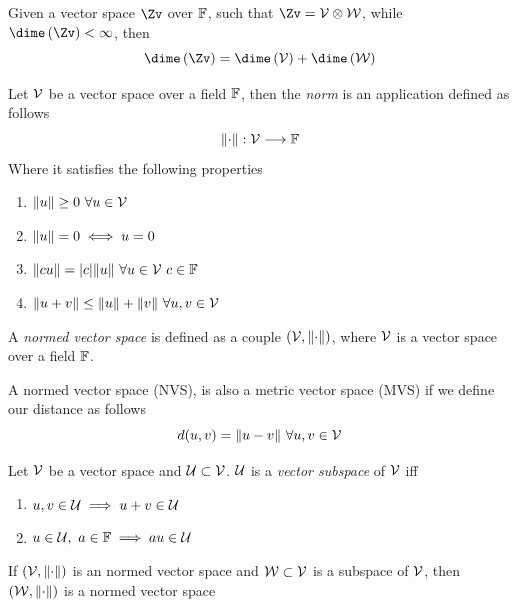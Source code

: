 \documentclass[../complete.tex]{subfiles}
\begin{document}
\begin{thm}
	Given a vector space $\Zv$ over $\mathbb{F}$, such that $\Zv=\V\otimes\W$, while $\dime\left( \Zv \right)<\infty$, then
	\begin{equation*}
		\dime\left( \Zv \right)=\dime\left( \V \right)+\dime\left( \W \right)
	\end{equation*}
\end{thm}
\begin{dfn}[Norm]
	Let $\mathcal{V}$ be a vector space over a field $\mathbb{F}$, then the \textit{norm} is an application defined as follows
	\begin{equation*}
		\norm{\cdot}:\mathcal{V}\overset{}{\longrightarrow}\mathbb{F}
	\end{equation*}
	Where it satisfies the following properties
	\begin{enumerate}
	\item $\norm{u}\ge0\ \forall u\in\mathcal{V}$
	\item $\norm{u}=0\iff u=0$
	\item $\norm{cu}=\abs{c}\norm{u}\ \forall u\in\mathcal{V}\ c\in\mathbb{F}$
	\item $\norm{u+v}\le\norm{u}+\norm{v}\ \forall u,v\in\V$
	\end{enumerate}
\end{dfn}
\begin{dfn}
	A \textit{normed vector space} is defined as a couple $(\mathcal{V},\norm{\cdot})$, where $\mathcal{V}$ is a vector space over a field $\mathbb{F}$.
\end{dfn}
\begin{prop}
	A normed vector space (NVS), is also a metric vector space (MVS) if we define our distance as follows
	\begin{equation*}
		d(u,v)=\norm{u-v}\ \forall u,v\in\mathcal{V}
	\end{equation*}
\end{prop}
\begin{dfn}
	Let $\mathcal{V}$ be a vector space and $\operatorname{\mathcal{U}}\subset\mathcal{V}$. $\operatorname{\mathcal{U}}$ is a \textit{vector subspace} of $\mathcal{V}$ iff
	\begin{enumerate}
	\item $u,v\in\operatorname{\mathcal{U}}\implies{} u+v\in\operatorname{\mathcal{U}}$
	\item $u\in\operatorname{\mathcal{U}},\ a\in\mathbb{F}\implies{} au\in\operatorname{\mathcal{U}}$
	\end{enumerate}
\end{dfn}
\begin{prop}
	If $(\mathcal{V},\norm{\cdot})$ is an normed vector space and $\mathcal{W}\subset\mathcal{V}$ is a subspace of $\mathcal{V}$, then $(\mathcal{W},\norm{\cdot})$ is a normed vector space
\end{prop}
\end{document}
